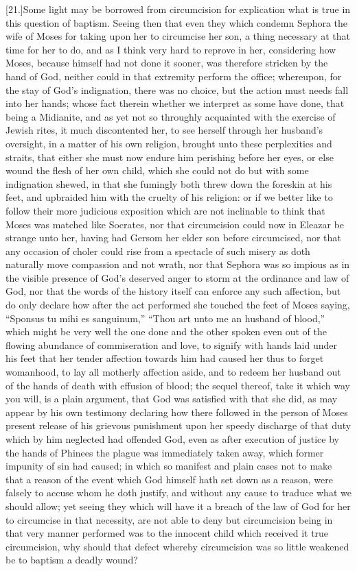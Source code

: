 [21.]Some light may be borrowed from circumcision for explication what is true in this question of baptism. Seeing then that even they which condemn Sephora the wife of Moses for taking upon her to circumcise her son, a thing necessary at that time for her to do, and as I think very hard to reprove in her, considering how Moses, because himself had not done it sooner, was therefore stricken by the hand of God, neither could in that extremity perform the office; whereupon, for the stay of God’s indignation, there was no choice, but the action must needs fall into her hands; whose fact therein whether we interpret as some have done, that being a Midianite, and as yet not so throughly acquainted with the exercise of Jewish rites, it much discontented her, to see herself through her husband’s oversight, in a matter of his own religion, brought unto these perplexities and straits, that either she must now endure him perishing before her eyes, or else wound the flesh of her own child, which she could not do but with some indignation shewed, in that she fumingly both threw down the foreskin at his feet, and upbraided him with the cruelty of his religion: or if we better like to follow their more judicious  exposition which are not inclinable to think that Moses was matched like Socrates, nor that circumcision could now in Eleazar be strange unto her, having had Gersom her elder son before circumcised, nor that any occasion of choler could rise from a spectacle of such misery as doth naturally move compassion and not wrath, nor that Sephora was so impious as in the visible presence of God’s deserved anger to storm at the ordinance and law of God, nor that the words of the history itself can enforce any such affection, but do only declare how after the act performed she touched the feet of Moses saying, “Sponsus tu mihi es sanguinum,” “Thou art unto me an husband of blood,” which might be very well the one done and the other spoken even out of the flowing abundance of commiseration and love, to signify with hands laid under his feet that her tender affection towards him had caused her thus to forget womanhood, to lay all motherly affection aside, and to redeem her husband out of the hands of death with effusion of blood; the sequel thereof, take it which way you will, is a plain argument, that God was satisfied with that she did, as may appear by his own testimony declaring how there followed in the person of Moses present release of  his grievous punishment upon her speedy discharge of that duty which by him neglected had offended God,
 even as after execution of justice by the hands of Phinees the plague was immediately taken away, which former impunity of sin had caused; in which so manifest and plain cases not to make that a reason of the event which God himself hath set down as a reason, were falsely to accuse whom he doth justify, and without any cause to traduce what we should allow; yet seeing they which will have it a breach of the law of God for her to circumcise in that necessity, are not able to deny but circumcision being in that very manner performed was to the innocent child which received it true circumcision, why should that defect whereby circumcision was so little weakened be to baptism a deadly wound?

